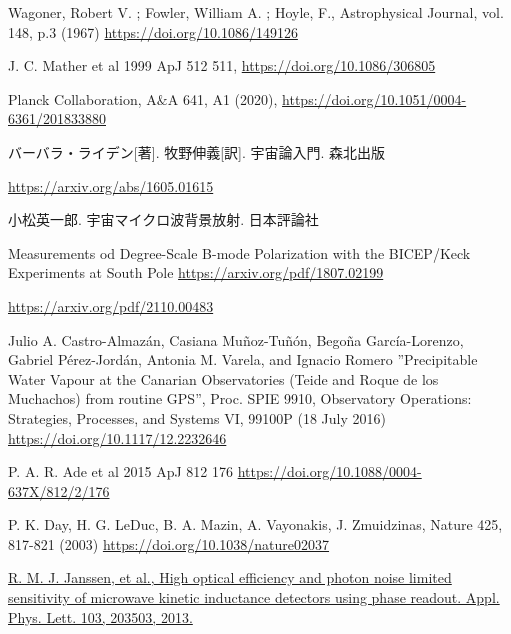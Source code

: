 \begin{thebibliography}{99}

Wagoner, Robert V. ; Fowler, William A. ; Hoyle, F., Astrophysical Journal, vol. 148, p.3 (1967)
\href{https://doi.org/10.1086/149126}{https://doi.org/10.1086/149126}

J. C. Mather et al 1999 ApJ 512 511,
\href{https://doi.org/10.1086/306805}{https://doi.org/10.1086/306805}

Planck Collaboration, A$\&$A 641, A1 (2020),
\href{https://doi.org/10.1051/0004-6361/201833880}{https://doi.org/10.1051/0004-6361/201833880}

バーバラ・ライデン[著]. 牧野伸義[訳]. 宇宙論入門. 森北出版

\href{https://arxiv.org/abs/1605.01615}{https://arxiv.org/abs/1605.01615}

小松英一郎. 宇宙マイクロ波背景放射. 日本評論社

Measurements od Degree-Scale B-mode Polarization with the BICEP/Keck Experiments at South Pole
\href{https://arxiv.org/pdf/1807.02199}{https://arxiv.org/pdf/1807.02199}

\href{https://arxiv.org/pdf/2110.00483}{https://arxiv.org/pdf/2110.00483}

Julio A. Castro-Almaz\'{a}n, Casiana Mu\~{n}oz-Tu\~{n}\'{o}n, Bego\~{n}a Garc\'{i}a-Lorenzo, Gabriel P\'{e}rez-Jord\'{a}n, Antonia M. Varela, and Ignacio Romero ”Precipitable Water Vapour at the Canarian Observatories (Teide and Roque de los Muchachos) from routine GPS”, Proc. SPIE 9910, Observatory Operations: Strategies, Processes, and Systems VI, 99100P (18 July 2016)
\href{https://doi.org/10.1117/12.2232646}{https://doi.org/10.1117/12.2232646}

P. A. R. Ade et al 2015 ApJ 812 176
\href{https://doi.org/10.1088/0004-637X/812/2/176}{https://doi.org/10.1088/0004-637X/812/2/176}

P. K. Day, H. G. LeDuc, B. A. Mazin, A. Vayonakis, J. Zmuidzinas, Nature 425,
817-821 (2003)
\href{https://doi.org/10.1038/nature02037}{https://doi.org/10.1038/nature02037}

\href{https://pubs.aip.org/aip/apl/article-abstract/103/20/203503/130528/High-optical-efficiency-and-photon-noise-limited?redirectedFrom=fulltext}{R. M. J. Janssen, et al., High optical efficiency and photon noise limited sensitivity of microwave kinetic inductance detectors using phase readout. Appl. Phys. Lett. 103, 203503, 2013.}


\end{thebibliography}
